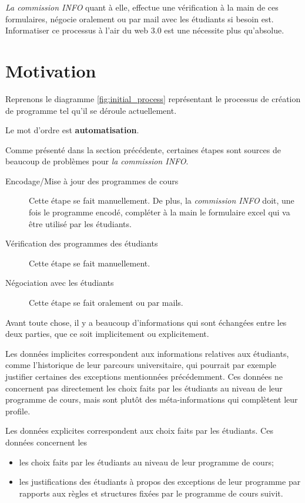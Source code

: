 \textit{La commission INFO} quant à elle, effectue une vérification à la main de ces formulaires, négocie oralement ou par mail avec les étudiants si besoin est. 
Informatiser ce processus à l'air du web 3.0 est une nécessite plus qu'absolue.



\section{Motivation}
Reprenons le diagramme \ref{fig:initial_process} représentant le processus de création de programme tel qu'il se déroule actuellement. 

Le mot d'ordre est \textbf{automatisation}.

Comme présenté dans la section précédente, certaines étapes sont sources de beaucoup de problèmes pour \textit{la commission INFO}.

\begin{description}
  \item[Encodage/Mise à jour des programmes de cours] Cette étape se fait manuellement. De plus, la \textit{ commission INFO} doit, une fois le programme encodé, compléter à la main le formulaire excel qui va être utilisé par les étudiants. 
  \item[Vérification des programmes des étudiants]  Cette étape se fait manuellement. 
  \item[Négociation avec les étudiants] Cette étape se fait oralement ou par mails.
\end{description} 

Avant toute chose, il y a beaucoup d'informations qui sont échangées entre les deux parties, que ce soit implicitement ou explicitement.

Les données implicites correspondent aux informations relatives aux étudiants, comme l'historique de leur parcours universitaire, qui pourrait par exemple justifier certaines des exceptions mentionnées précédemment. Ces données ne concernent pas directement les choix faits par les étudiants au niveau de leur programme de cours, mais sont plutôt des méta-informations qui complètent leur profile. 

Les données explicites correspondent aux choix faits par les étudiants. Ces données concernent les
\begin{itemize}
\item les choix faits par les étudiants au niveau de leur programme de cours;
\item les justifications des étudiants à propos des exceptions de leur programme par rapports aux règles et structures fixées par le programme de cours suivit. 
\end{itemize}

